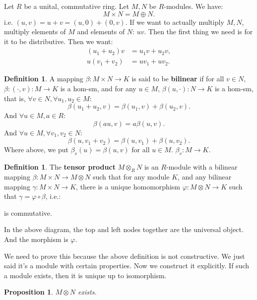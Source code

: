 \documentclass[12pt]{amsbook}
\theoremstyle{plain}
\numberwithin{section}{chapter}
\numberwithin{equation}{chapter}
\newtheorem{Prop}[theorem]{Proposition}
\theoremstyle{definition}
\newtheorem{Def}[theorem]{Definition}
\theoremstyle{remark}
\newcommand{\bee}{\begin{equation}\begin{aligned}}
\newcommand{\eee}{\end{aligned}\end{equation}}
\renewcommand{\phi}{\varphi}
\begin{document}
Let $R$ be a unital, commutative ring. Let $M,N$ be $R$-modules. We have:
$$
M \times N = M \oplus N.
$$
i.e. $(u,v) = u + v = (u,0) + (0,v)$. If we want to actually multiply $M,N$, multiply elements of $M$ and elements of $N$: $uv$. Then the first thing we need is for it to be distributive. Then we want:
 \bee
 (u_1 + u_2)v &= u_1v + u_2v,\\
 u(v_1 + v_2) &= uv_1 + uv_2.
 \eee
 \begin{Def}
 A mapping $\beta: M \times N \to K$ is said to be \textbf{bilinear} if for all $v \in N$, $\beta:(\cdot,v):M \to K$ is a hom-sm, and for any $u \in M$, $\beta(u,\cdot):N \to K$ is a hom-sm, that is, $\forall v \in N,\forall u_1,u_2 \in M$:
 $$
 \beta(u_1 + u_2,v) = \beta(u_1,v) + \beta(u_2,v).
 $$
 And $\forall u \in M,a \in R$:
 $$
 \beta(au,v) = a\beta(u,v).
 $$
 And $\forall u \in M,\forall v_1,v_2 \in N$:
 $$
 \beta(u,v_1  + v_2) = \beta(u,v_1) + \beta(u,v_2).
 $$
 Where above, we put $\beta_v(u) = \beta(u,v)$ for all $u \in M$. $\beta_v:M \to K$. 
 \end{Def}
 
 \begin{Def}
 The \textbf{tensor product} $M \otimes_R N$ is an $R$-module with a bilinear mapping $\beta:M \times N \to M \otimes N$ such that for any module $K$, and any bilinear mapping $\gamma:M \times N \to K$, there is a unique homomorphism $\phi: M \otimes N \to K$ such that $\gamma = \phi \circ \beta$, i.e.: 
 
 \begin{center}
\end{center}

is commutative. 
 
 \end{Def}
 
 In the above diagram, the top and left nodes together are the universal object. And the morphism is $\phi$. 
 
  We need to prove this because the above definition is not constructive. We just said it's a module with certain properties. Now we construct it explicitly. If such a module exists, then it is unique up to isomorphism. 
 
 \begin{Prop}
 $M \otimes N$ exists. 
 \end{Prop}
\end{document}
